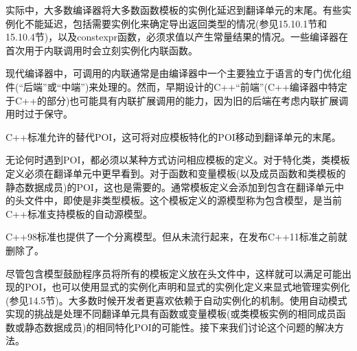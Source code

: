 实际中，大多数编译器将大多数函数模板的实例化延迟到翻译单元的末尾。有些实例化不能延迟，包括需要实例化来确定导出返回类型的情况(参见15.10.1节和15.10.4节)，以及constexpr函数，必须求值以产生常量结果的情况。一些编译器在首次用于内联调用时会立刻实例化内联函数。

\begin{tcolorbox}[colback=webgreen!5!white,colframe=webgreen!75!black]
\hspace*{0.75cm}现代编译器中，可调用的内联通常是由编译器中一个主要独立于语言的专门优化组件(“后端”或“中端”)来处理的。然而，早期设计的C++“前端”(C++编译器中特定于C++的部分)也可能具有内联扩展调用的能力，因为旧的后端在考虑内联扩展调用时过于保守。
\end{tcolorbox}

C++标准允许的替代POI，这可将对应模板特化的POI移动到翻译单元的末尾。


无论何时遇到POI，都必须以某种方式访问相应模板的定义。对于特化类，类模板定义必须在翻译单元中更早看到。对于函数和变量模板(以及成员函数和类模板的静态数据成员)的POI，这也是需要的。通常模板定义会添加到包含在翻译单元中的头文件中，即使是非类型模板。这个模板定义的源模型称为包含模型，是当前C++标准支持模板的自动源模型。

\begin{tcolorbox}[colback=webgreen!5!white,colframe=webgreen!75!black]
\hspace*{0.75cm}C++98标准也提供了一个分离模型。但从未流行起来，在发布C++11标准之前就删除了。
\end{tcolorbox}

尽管包含模型鼓励程序员将所有的模板定义放在头文件中，这样就可以满足可能出现的POI，也可以使用显式的实例化声明和显式的实例化定义来显式地管理实例化(参见14.5节)。大多数时候开发者更喜欢依赖于自动实例化的机制。使用自动模式实现的挑战是处理不同翻译单元具有函数或变量模板(或类模板实例的相同成员函数或静态数据成员)的相同特化POI的可能性。接下来我们讨论这个问题的解决方法。







